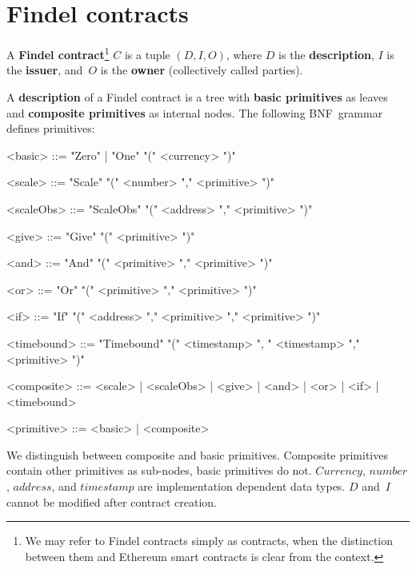 \section{Findel contracts} \label{sec:Ch10FindelSyntax}

\begin{definition} \label{def:Ch10FindelFindelContract}
	A \textbf{Findel contract}\footnote{We may refer to Findel contracts simply as contracts, when the distinction between them and Ethereum smart contracts is clear from the context.} $C$ is a tuple $(D,I,O)$, where $D$ is the \textbf{description}, $I$ is the \textbf{issuer}, and~$O$ is the \textbf{owner} (collectively called parties). 
\end{definition}

\begin{definition} \label{def:Ch10FindelDescription}
	A \textbf{description} of a Findel contract is a tree with \textbf{basic primitives} as leaves and \textbf{composite primitives} as internal nodes. The following BNF~grammar defines primitives:
	\begin{grammar}
		
		<basic> ::= "Zero" | "One" "(" <currency> ")"
		
		<scale> ::= "Scale" "(" <number> "," <primitive> ")"
		
		<scaleObs> ::= "ScaleObs" "(" <address> "," <primitive> ")"
		
		<give> ::= "Give" "(" <primitive> ")"
		
		<and> ::= "And" "(" <primitive> "," <primitive> ")"
		
		<or> ::= "Or" "(" <primitive> "," <primitive> ")"
		
		<if> ::= "If" "(" <address> "," <primitive> "," <primitive> ")"
		
		<timebound> ::= "Timebound" "(" <timestamp> ", " <timestamp> "," <primitive> ")"
		
		<composite> ::= <scale> | <scaleObs> | <give> | <and> | <or> | <if> | <timebound>
		
		<primitive> ::= <basic> | <composite>
		
	\end{grammar}
\end{definition}

We distinguish between composite and basic primitives.
Composite primitives contain other primitives as sub-nodes, basic primitives do not.
\(Currency\), \(number\), \(address\), and \(timestamp\) are implementation dependent data types.
$D$ and~$I$ cannot be modified after contract creation.

